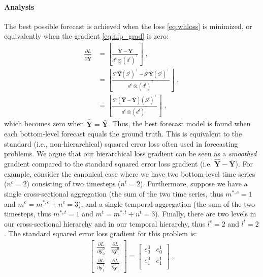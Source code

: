 \documentclass[preprint, 3p, times, twocolumn]{elsarticle}
\begin{document}
\paragraph{Analysis} The best possible forecast is achieved when the loss \eqref{eq:whloss} is minimized, or equivalently when the gradient \eqref{eq:hfp_grad} is zero:
\begin{align} 
  \frac{\partial L}{\partial \tilde{\textbf{Y}}} &=  \left[ \frac{\tilde{\textbf{Y}} - \textbf{Y}}{ d^c \otimes (d^t)^\intercal } \right] \;, \nonumber \\
                                                 &=  \left[ \frac{S^c \hat{\textbf{Y}} (S^t)^\intercal - S^c \bar{\textbf{Y}} (S^t)^\intercal}{ d^c \otimes (d^t)^\intercal } \right] \;, \nonumber \\
                                                 &=  \left[ \frac{S^c \left(\hat{\textbf{Y}} - \bar{\textbf{Y}}\right) (S^t)^\intercal}{ d^c \otimes (d^t)^\intercal } \right] \;, \nonumber
\end{align}
which becomes zero when \(\hat{\textbf{Y}} = \bar{\textbf{Y}}\). Thus, the best forecast model is found when each bottom-level forecast equals the ground truth. This is equivalent to the standard (i.e., non-hierarchical) squared error loss often used in forecasting problems. We argue that our hierarchical loss gradient can be seen as a \textit{smoothed} gradient compared to the standard squared error loss gradient (i.e. \(\hat{\textbf{Y}} - \bar{\textbf{Y}}\)). For example, consider the canonical case where we have two bottom-level time series (\(n^c=2\)) consisting of two timesteps (\(n^t=2\)). Furthermore, suppose we have a single cross-sectional aggregation (the sum of the two time series, thus \(m^{*,c} = 1\) and \(m^c = m^{*,c} + n^c = 3\)), and a single temporal aggregation (the sum of the two timesteps, thus \(m^{*,t} = 1\) and \(m^t = m^{*,t} + n^t = 3\)). Finally, there are two levels in our cross-sectional hierarchy and in our temporal hierarchy, thus \(l^c = 2\) and \(l^t = 2\). The standard squared error loss gradient for this problem is:
\begin{align} \label{eq:sqloss_grad}
  \begin{bmatrix}
    \frac{\partial L}{\partial \hat{\textbf{y}}^0_{0}} & \frac{\partial L}{\partial \hat{\textbf{y}}^0_{1}} \\
    \frac{\partial L}{\partial \hat{\textbf{y}}^1_{1}} & \frac{\partial L}{\partial \hat{\textbf{y}}^1_{1}}
    \end{bmatrix} 
    = 
\begin{bmatrix}
  e_0^0 & e_0^1 \\
  e_1^0 & e_1^1 \\
\end{bmatrix}  \;, 
\end{align}
\end{document}
